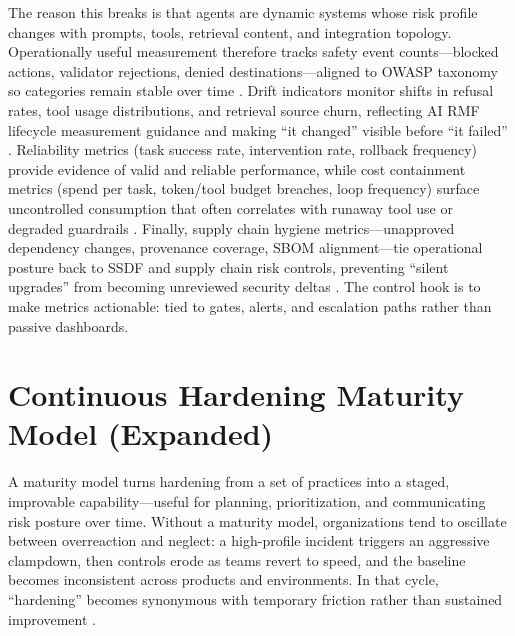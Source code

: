 \begin{TNtwocol}
  The reason this breaks is that agents are dynamic systems whose risk profile changes with prompts, tools, retrieval content, and integration topology. Operationally useful measurement therefore tracks safety event counts—blocked actions, validator rejections, denied destinations—aligned to OWASP taxonomy so categories remain stable over time \cite{owasp-top10-llm-2025,nist-sp800-53b}. Drift indicators monitor shifts in refusal rates, tool usage distributions, and retrieval source churn, reflecting AI RMF lifecycle measurement guidance and making “it changed” visible before “it failed” \cite{nist-airmf-100-1,nist-genai-600-1}. Reliability metrics (task success rate, intervention rate, rollback frequency) provide evidence of valid and reliable performance, while cost containment metrics (spend per task, token/tool budget breaches, loop frequency) surface uncontrolled consumption that often correlates with runaway tool use or degraded guardrails \cite{nist-airmf-100-1,cisa-ztmm-v2}. Finally, supply chain hygiene metrics—unapproved dependency changes, provenance coverage, SBOM alignment—tie operational posture back to SSDF and supply chain risk controls, preventing “silent upgrades” from becoming unreviewed security deltas \cite{nist-sp800-218,owasp-top10-llm-2025}. The control hook is to make metrics actionable: tied to gates, alerts, and escalation paths rather than passive dashboards.


  \section{Continuous Hardening Maturity Model (Expanded)}
  A maturity model turns hardening from a set of practices into a staged, improvable capability—useful for planning, prioritization, and communicating risk posture over time. Without a maturity model, organizations tend to oscillate between overreaction and neglect: a high-profile incident triggers an aggressive clampdown, then controls erode as teams revert to speed, and the baseline becomes inconsistent across products and environments. In that cycle, “hardening” becomes synonymous with temporary friction rather than sustained improvement \cite{nist-airmf-100-1,owasp-top10-llm-2025}.


\end{TNtwocol}
